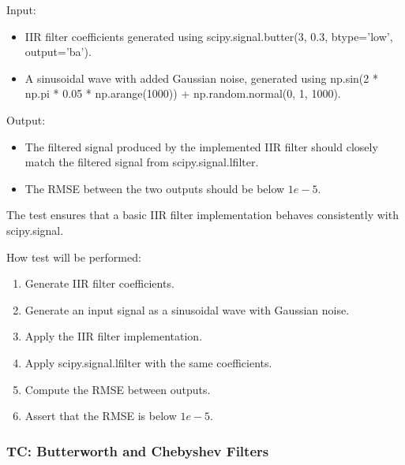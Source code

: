 \documentclass[12pt, titlepage]{article}
\begin{document}
\begin{enumerate}
Input:
\begin{itemize}
  \item IIR filter coefficients generated using scipy.signal.butter(3, 0.3,
  btype='low', output='ba').
  \item A sinusoidal wave with added Gaussian noise, generated using np.sin(2 *
  np.pi * 0.05 * np.arange(1000)) + np.random.normal(0, 1, 1000).
\end{itemize}

Output:
\begin{itemize}
  \item The filtered signal produced by the implemented IIR filter should
  closely match the filtered signal from scipy.signal.lfilter.
  \item The RMSE between the two outputs should be below $1e-5$.
\end{itemize}

The test ensures that a basic IIR filter implementation behaves consistently
with scipy.signal.

How test will be performed: 
\begin{enumerate}
  \item Generate IIR filter coefficients.
  \item Generate an input signal as a sinusoidal wave with Gaussian noise.
  \item Apply the IIR filter implementation.
  \item Apply scipy.signal.lfilter with the same coefficients.
  \item Compute the RMSE between outputs.
  \item Assert that the RMSE is below $1e-5$.
\end{enumerate}

\end{enumerate}

 \label{TC_BUT_CHEB}
\subsubsection{TC\thetestcasenum : Butterworth and Chebyshev Filters}
\end{document}
